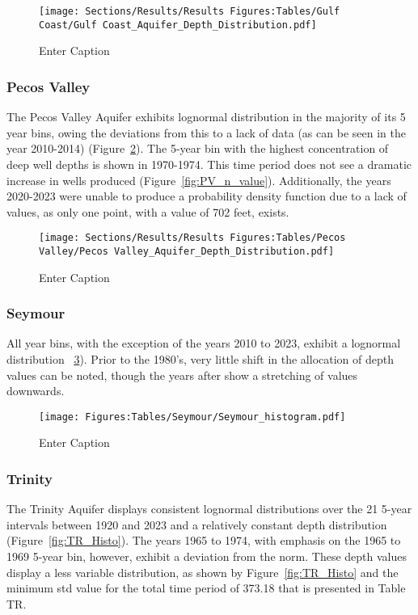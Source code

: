 \begin{figure}[H]
    \centering
    \texttt{[image: Sections/Results/Results Figures:Tables/Gulf Coast/Gulf Coast\_Aquifer\_Depth\_Distribution.pdf]}
    \caption{Enter Caption}
    \label{fig:GC_Histo}
\end{figure}

\subsubsection*{Pecos Valley}
The Pecos Valley Aquifer exhibits lognormal distribution in the majority of its 5 year bins, owing the deviations from this to a lack of data (as can be seen in the year 2010-2014) (Figure~\ref{fig:PV_Histo}). The 5-year bin with the highest concentration of deep well depths is shown in 1970-1974. This time period does not see a dramatic increase in wells produced (Figure~\ref{fig:PV_n_value}). Additionally, the years 2020-2023 were unable to produce a probability density function due to a lack of values, as only one point, with a value of 702 feet, exists.


\begin{figure}[H]
    \centering
    \texttt{[image: Sections/Results/Results Figures:Tables/Pecos Valley/Pecos Valley\_Aquifer\_Depth\_Distribution.pdf]}
    \caption{Enter Caption}
    \label{fig:PV_Histo}
\end{figure}

\subsubsection*{Seymour}
All year bins, with the exception of the years 2010 to 2023, exhibit a lognormal distribution ~\ref{fig:SM_Histo}). Prior to the 1980’s, very little shift in the allocation of depth values can be noted, though the years after show a stretching of values downwards.

\begin{figure}[H]
    \centering
    \texttt{[image: Figures:Tables/Seymour/Seymour\_histogram.pdf]}
    \caption{Enter Caption}
    \label{fig:SM_Histo}
\end{figure}

\subsubsection*{Trinity}
The Trinity Aquifer displays consistent lognormal distributions over the 21 5-year intervals between 1920 and 2023 and a relatively constant depth distribution (Figure~\ref{fig:TR_Histo}). The years 1965 to 1974, with emphasis on the 1965 to 1969 5-year bin, however, exhibit a deviation from the norm. These depth values display a less variable distribution, as shown by Figure~\ref{fig:TR_Histo} and the minimum std value for the total time period of 373.18 that is presented in Table TR.

